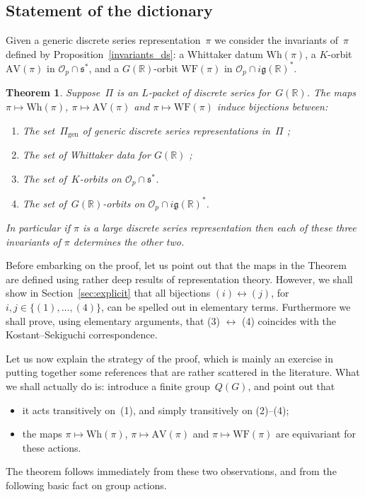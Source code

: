 \documentclass[10pt,leqno]{article}
\newtheorem{theorem}[equation]{Theorem}
\newcommand{\R}{\mathbb R}
\newcommand{\g}{\mathfrak g}
\newcommand{\s}{\mathfrak s}
\newcommand{\AV}{\mathrm{AV}}
\newcommand{\Wh}{\mathrm{Wh}}
\newcommand{\WF}{\mathrm{WF}}
\begin{document}
\subsection{Statement of the dictionary}  



Given a generic discrete series representation~$\pi$ we consider the invariants of~$\pi$ defined by Proposition~\ref{invariants_ds}: a Whittaker datum  $\Wh(\pi)$, a $K$-orbit $\AV(\pi)$ in $\mathcal{O}_p \cap \s^*$, and a $G(\R)$-orbit $\WF(\pi)$ in $\mathcal{O}_p \cap  i \g(\R)^*$.


\begin{theorem} \label{th:main} Suppose~$\Pi$ is an $L$-packet of discrete series for~$G(\R)$. 
The maps $\pi \mapsto \Wh(\pi)$, $\pi \mapsto \AV(\pi)$ and $\pi\mapsto \WF(\pi)$ induce bijections between:
\begin{enumerate}
\item[(1)] The set~$\Pi_{\mathrm{gen}}$ of generic discrete series representations in~$\Pi$ ;
\item[(2)] The set of Whittaker data for $G(\R)$ ;
\item[(3)] The set of~$K$-orbits on $\mathcal{O}_p \cap \s^*$.
\item[(4)] The set of~$G(\R)$-orbits on $\mathcal{O}_p \cap  i \g(\R)^*$.
\end{enumerate}
In particular if $\pi$ is a large discrete series representation then each of these three invariants of $\pi$ determines the other two. 
\end{theorem}

Before embarking on the proof, let us point out that the maps in the Theorem are defined using rather deep results of representation theory. However, we shall show in Section~\ref{sec:explicit} that all bijections $(i) \leftrightarrow (j)$, for $i,j \in \{(1), \dots, (4)\}$, can be spelled out in elementary terms. Furthermore we shall prove, using elementary arguments, that (3) $\leftrightarrow$ (4) coincides with the Kostant--Sekiguchi correspondence.  



Let us now explain the strategy of the proof, which is mainly an exercise in putting together some references that are rather scattered in the literature. What we shall actually do is: introduce a finite group~$Q(G)$, and point out that 
\begin{itemize}
\item[(i)] it acts transitively on~(1), and simply transitively on (2)--(4);
\item[(ii)] the maps $\pi \mapsto \Wh(\pi)$, $\pi \mapsto \AV(\pi)$ and $\pi\mapsto \WF(\pi)$  are equivariant for these actions.
\end{itemize}
The theorem follows immediately from these two observations, and from the following basic fact on group actions.
\end{document}
